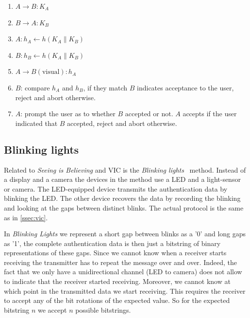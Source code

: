 \documentclass[conference, 11pt]{sty/IEEEtran}
\newlength{\arrow}
\begin{document}
\begin{enumerate}
    \item $A \rightarrow B: K_A$
    \item $B \rightarrow A: K_B$
    \item $A: h_A \gets h(K_A \| K_B)$
    \item $B: h_B \gets h(K_A \| K_B)$
    \item $A \rightarrow B(\text{visual}): h_A$
    \item $B$: compare $h_A$ and $h_B$, if they match $B$ indicates acceptance to the user, reject and abort otherwise.
    \item $A$: prompt the user as to whether $B$ accepted or not. $A$ accepts if the user indicated that $B$ accepted, reject and abort otherwise.
\end{enumerate}




\subsection{Blinking lights}
Related to \textit{Seeing is Believing} and VIC is the \textit{Blinking lights}~\cite{saxena2006secure} method.
Instead of a display and a camera the devices in the method use a LED and a light-sensor or camera.
The LED-equipped device transmits the authentication data by blinking the LED.
The other device recovers the data by recording the blinking and looking at the gaps between distinct blinks.
The actual protocol is the same as in \autoref{ssec:vic}.

In \emph{Blinking Lights} we represent a short gap between blinks as a '0' and long gaps as '1', the complete authentication data is then just a bitstring of binary representations of these gaps.
Since we cannot know when a receiver starts receiving the transmitter has to repeat the message over and over.
Indeed, the fact that we only have a unidirectional channel (LED to camera) does not allow to indicate that the receiver started receiving.
Moreover, we cannot know at which point in the transmitted data we start receiving.
This requires the receiver to accept any of the bit rotations of the expected value.
So for the expected bitstring $n$ we accept $n$ possible bitstrings.
\end{document}
